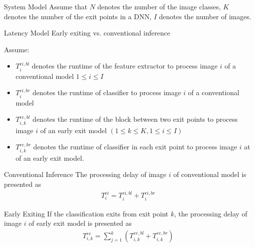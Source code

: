 \begin{enumdescript}
	\item[System Model]
	Assume that $ N $ denotes the number of the image classes, $ K $ denotes the number of the exit points in a DNN, $ I $ denotes the number of images.
	\begin{enumdescript}
		\item[Latency Model] Early exiting vs. conventional inference
		
			Assume:
		\begin{itemize}
			\item $T_{i}^{ci,bl}$ denotes the runtime of the feature extractor to process image $ i $ of a conventional model $1 \leq i \leq I$
			\item $T_{i}^{ci,br}$ denotes the runtime of classifier to process image $i$ of a conventional model 
			\item $T_{i,k}^{ee,bl}$ denotes the runtime of the block between two exit points to process image $ i $ of an early exit model $(1 \leq k \leq K, 1 \leq i \leq I)$
			\item $T_{i,k}^{ee,br}$ denotes the runtime of classifier in each exit point to process image $i$ at of an early exit model.
			
		\end{itemize}
		\begin{enumdescript}
			\item[Conventional Inference]  The processing delay of image $ i $ of conventional model is presented as
			\begin{align}
			T_{i}^{ci}=T_{i}^{ci,bl} + T_{i}^{ci,br}
			\end{align}
			\item[Early Exiting] If the classification exits from exit point $ k $, the processing delay of image $ i $ of early exit model is presented as
			\begin{align}
			T_{i,k}^{ee}=\sum_{j=1}^{k} \left(T_{i,k}^{ee,bl} + T_{i,k}^{ee,br} \right) 
			\end{align}
		\end{enumdescript}
					

\end{enumdescript}
\end{enumdescript}
